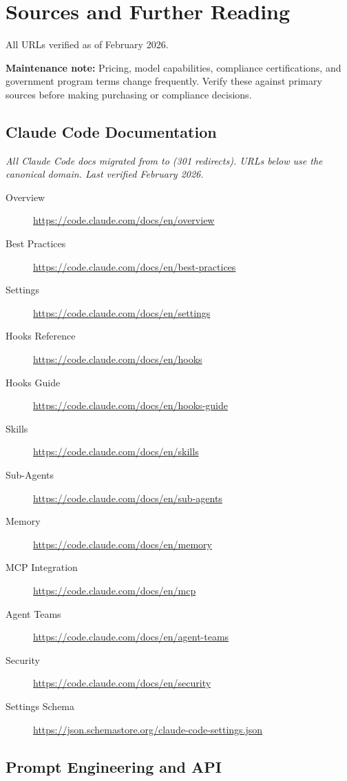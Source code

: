 \chapter{Sources and Further Reading}
\label{app:sources}

All URLs verified as of February 2026.

\textbf{Maintenance note:} Pricing, model capabilities, compliance certifications,
and government program terms change frequently. Verify these against primary
sources before making purchasing or compliance decisions.

\section{Claude Code Documentation}

{\footnotesize \textit{All Claude Code docs migrated from
 to  (301 redirects).
URLs below use the canonical domain. Last verified February 2026.}}

\begin{description}
  \item[Overview] \url{https://code.claude.com/docs/en/overview}
  \item[Best Practices] \url{https://code.claude.com/docs/en/best-practices}
  \item[Settings] \url{https://code.claude.com/docs/en/settings}
  \item[Hooks Reference] \url{https://code.claude.com/docs/en/hooks}
  \item[Hooks Guide] \url{https://code.claude.com/docs/en/hooks-guide}
  \item[Skills] \url{https://code.claude.com/docs/en/skills}
  \item[Sub-Agents] \url{https://code.claude.com/docs/en/sub-agents}
  \item[Memory] \url{https://code.claude.com/docs/en/memory}
  \item[MCP Integration] \url{https://code.claude.com/docs/en/mcp}
  \item[Agent Teams] \url{https://code.claude.com/docs/en/agent-teams}
  \item[Security] \url{https://code.claude.com/docs/en/security}
  \item[Settings Schema] \url{https://json.schemastore.org/claude-code-settings.json}
\end{description}

\section{Prompt Engineering and API}

